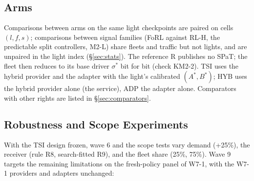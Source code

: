 \subsection{Arms}
Comparisons between arms on the same light checkpoints are paired on cells $(l,f,s)$; comparisons between signal families (FoRL against
RL-H, the predictable split controllers, M2-L) share fleets and traffic but not lights, and are unpaired in the light index
(§\ref{sec:stats}). The reference R publishes no SPaT; the fleet then reduces to its base driver $\sigma^*$
bit for bit (check KM2-2). TSI uses the hybrid provider and the adapter with the light's calibrated $(A^*,B^*)$; HYB uses the hybrid
provider alone (the service), ADP the adapter alone. Comparators with other rights are listed in §\ref{sec:comparators}.

\subsection{Robustness and Scope Experiments}\label{sec:robustdesign}
With the TSI design frozen, wave 6 and the scope tests vary demand (+25\%), the receiver (rule R8, search-fitted R9), and the fleet share
(25\%, 75\%). Wave 9 targets the remaining limitations on the fresh-policy panel of W7-1, with the W7-1 providers and adapters unchanged:
